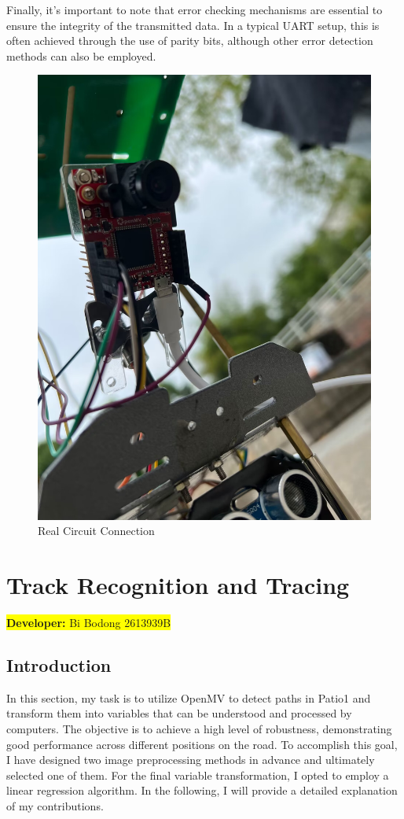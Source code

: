 \documentclass[12pt, a4paper, oneside]{report}
\begin{document}
Finally, it's important to note that error checking mechanisms are essential to ensure the integrity of the transmitted data. In a typical UART setup, this is often achieved through the use of parity bits, although other error detection methods can also be employed.
\begin{figure}[H]
    \centering
    \includegraphics[scale=0.1]{pic/communication/uart3.png}
    \caption{Real Circuit Connection}
    \label{cir-real}
\end{figure}

\newpage
\section{Track Recognition and Tracing}\label{sec:Tracing}
\colorbox{yellow}{\textbf{Developer:} Bi Bodong 2613939B}

\subsection{Introduction}	
In this section, my task is to utilize OpenMV to detect paths in Patio1 and transform them into variables that can be understood and processed by computers. The objective is to achieve a high level of robustness, demonstrating good performance across different positions on the road. To accomplish this goal, I have designed two image preprocessing methods in advance and ultimately selected one of them. For the final variable transformation, I opted to employ a linear regression algorithm. In the following, I will provide a detailed explanation of my contributions.
    
\end{document}
